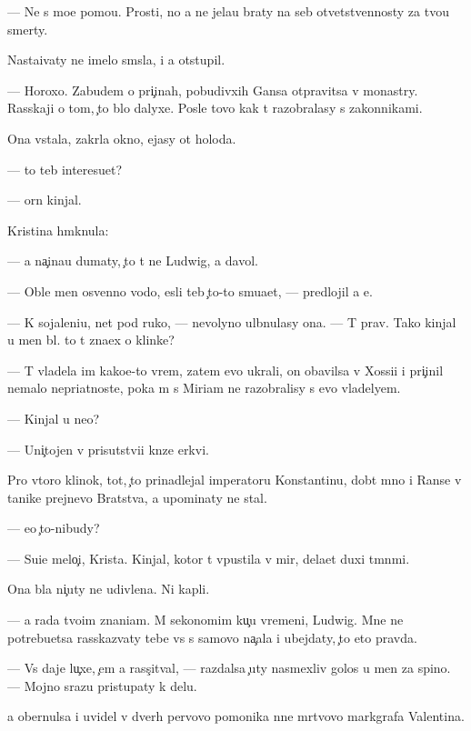 \documentclass[10pt]{book}
\begin{document}
— Ne s mo{\y}e{\y} pomo{\x}{\y}u. Prosti, no {\y}a ne jela{\y}u braty na seb{\ia} otvetstvennosty za tvo{\y}u smerty.

Nasta{\y}ivaty ne imelo sm{\yi}sla, i {\y}a otstupil.

— Horoxo. Zabudem o pri{\c}inah, pobudivxih Gansa otpravitsa v monast{\yi}ry. Rasskaji o tom, {\c}to b{\yi}lo dalyxe. Posle tovo kak t{\yi} razobralasy s zakonnikami.

Ona vstala, zakr{\yi}la okno, {\y}ejasy ot holoda.

— {\C}to teb{\ia} interesu{\y}et?

—  {\C}orn{\yi}{\y} kinjal.

Kristina hm{\yi}knula:

— {\Y}a na{\c}ina{\y}u dumaty, {\c}to t{\yi} ne Ludwig, a d{\y}avol.

— Oble{\y} men{\ia} osv{\ia}{\x}enno{\y} vodo{\y}, {\y}esli teb{\ia} {\c}to-to smu{\x}a{\y}et, — predlojil {\y}a {\y}e{\y}.

— K sojaleni{\y}u, net pod ruko{\y}, — nevolyno ul{\yi}bnulasy ona. — T{\yi} prav. Tako{\y} kinjal u men{\ia} b{\yi}l. {\C}to t{\yi} zna{\y}ex o klinke?

— T{\yi} vladela im kako{\y}e-to vrem{\ia}, zatem {\y}evo ukrali, on ob{\y}avilsa v Xossi{\y}i i pri{\c}inil nemalo nepri{\y}atnoste{\y}, poka m{\yi} s Miriam ne razobralisy s {\y}evo vladely{\q}em.

— Kinjal u ne{\y}o?

— Uni{\c}tojen v prisutstvi{\y}i kn{\ia}ze{\y} {\Q}erkvi.

Pro vtoro{\y} klinok, tot, {\c}to prinadlejal imperatoru Konstantinu, dob{\yi}t{\yi}{\y} mno{\y} i Ranse v ta{\y}nike prejnevo Bratstva, {\y}a upominaty ne stal.

— {\y}e{\x}o {\c}to-nibudy?

— Su{\x}i{\y}e melo{\c}i, Krista. Kinjal, kotor{\yi}{\y} t{\yi} v{\yi}pustila v mir, dela{\y}et duxi t{\e}mn{\yi}mi.

Ona b{\yi}la ni{\c}uty ne udivlena. Ni kapli.

— {\Y}a rada tvo{\y}im znani{\y}am. M{\yi} sekonomim ku{\c}u vremeni, Ludwig. Mne ne potrebu{\y}etsa rasskaz{\yi}vaty tebe vs{\e} s samovo na{\c}ala i ubejdaty, {\c}to eto pravda.

— Vs{\e} daje lu{\c}xe, {\c}em {\y}a rass{\c}it{\yi}val, — razdalsa {\c}uty nasmexliv{\yi}{\y} golos u men{\ia} za spino{\y}. — Mojno srazu pristupaty k delu.

{\Y}a obernulsa i uvidel v dver{\ia}h pervovo pomo{\x}nika n{\yi}ne m{\e}rtvovo markgrafa Valentina.
\end{document}
